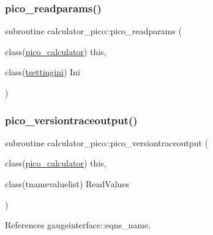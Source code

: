 \mbox{\label{namespacecalculator__pico_a974f29861363802129a96c29e70ea03e}} 
\subsubsection{\texorpdfstring{pico\+\_\+readparams()}{pico\_readparams()}}
{\footnotesize\ttfamily subroutine calculator\+\_\+pico\+::pico\+\_\+readparams (\begin{DoxyParamCaption}\item[{class(\mbox{\hyperlink{structcalculator__pico_1_1pico__calculator}{pico\+\_\+calculator}})}]{this,  }\item[{class(\mbox{\hyperlink{structsettings_1_1tsettingini}{tsettingini}})}]{Ini }\end{DoxyParamCaption})}

\mbox{\label{namespacecalculator__pico_ad5f92039b6c79eac4c4aeb00e53da084}} 
\subsubsection{\texorpdfstring{pico\+\_\+versiontraceoutput()}{pico\_versiontraceoutput()}}
{\footnotesize\ttfamily subroutine calculator\+\_\+pico\+::pico\+\_\+versiontraceoutput (\begin{DoxyParamCaption}\item[{class(\mbox{\hyperlink{structcalculator__pico_1_1pico__calculator}{pico\+\_\+calculator}})}]{this,  }\item[{class(tnamevaluelist)}]{Read\+Values }\end{DoxyParamCaption})\hspace{0.3cm}{\ttfamily [private]}}



References gaugeinterface\+::eqns\+\_\+name.

